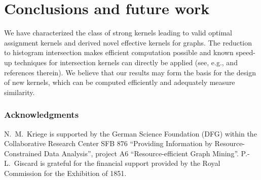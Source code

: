 \documentclass{article}
\begin{document}
\section{Conclusions and future work}
We have characterized the class of strong kernels leading to valid optimal 
assignment kernels and derived novel effective kernels for graphs. 
The reduction to histogram intersection makes efficient computation possible and
known speed-up techniques for intersection kernels can directly be 
applied (see, e.g., \cite{Vedaldi2012} and references therein).
We believe that our results may form the basis for the design of new kernels, 
which can be computed efficiently and adequately measure similarity.



\begin{small}
\subsubsection*{Acknowledgments}

N.~M.~Kriege is supported by the German Science Foundation (DFG) within the Collaborative Research Center SFB 876 ``Providing Information by 
Resource-Constrained Data Analysis'', project A6 ``Resource-efficient Graph Mining''.
P.-L.~Giscard is grateful for the financial support provided by the Royal Commission for the Exhibition of 1851.



\end{small}
\end{document}
